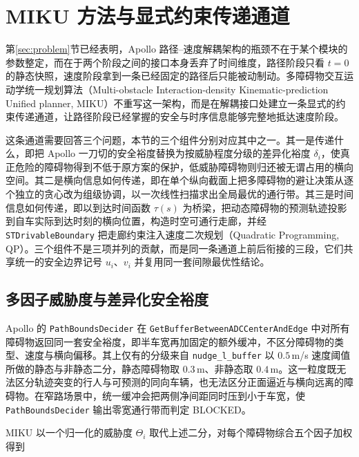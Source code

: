 \documentclass[a4paper,11pt]{ctexart}
\theoremstyle{definition}
\begin{document}

\section{MIKU 方法与显式约束传递通道}
\label{sec:method}

第\ref{sec:problem}节已经表明，Apollo 路径--速度解耦架构的瓶颈不在于某个模块的参数整定，而在于两个阶段之间的接口本身丢弃了时间维度，路径阶段只看 $t=0$ 的静态快照，速度阶段拿到一条已经固定的路径后只能被动制动。多障碍物交互运动学统一规划算法（Multi-obstacle Interaction-density Kinematic-prediction Unified planner, MIKU）不重写这一架构，而是在解耦接口处建立一条显式的约束传递通道，让路径阶段已经掌握的安全与时序信息能够完整地抵达速度阶段。

这条通道需要回答三个问题，本节的三个组件分别对应其中之一。其一是传递什么，即把 Apollo 一刀切的安全裕度替换为按威胁程度分级的差异化裕度 $\delta_i$，使真正危险的障碍物得到不低于原方案的保护，低威胁障碍物则归还被无谓占用的横向空间。其二是横向信息如何传递，即在单个纵向截面上把多障碍物的避让决策从逐个独立的贪心改为组级协调，以一次线性扫描求出全局最优的通行带。其三是时间信息如何传递，即以到达时间函数 $\tau(s)$ 为桥梁，把动态障碍物的预测轨迹投影到自车实际到达时刻的横向位置，构造时空可通行走廊，并经 \texttt{STDrivableBoundary} 把走廊约束注入速度二次规划（Quadratic Programming, QP）。三个组件不是三项并列的贡献，而是同一条通道上前后衔接的三段，它们共享统一的安全边界记号 $u_i$、$v_i$ 并复用同一套间隙最优性结论。

\subsection{多因子威胁度与差异化安全裕度}
\label{sec:method_threat}

Apollo 的 \texttt{PathBoundsDecider} 在 \texttt{GetBufferBetweenADCCenterAndEdge} 中对所有障碍物返回同一套安全裕度，即半车宽再加固定的额外缓冲，不区分障碍物的类型、速度与横向偏移。其上仅有的分级来自 \texttt{nudge\_l\_buffer} 以 $0.5$\,m/s 速度阈值所做的静态与非静态二分，静态障碍物取 $0.3$\,m、非静态取 $0.4$\,m。这一粒度既无法区分轨迹突变的行人与可预测的同向车辆，也无法区分正面逼近与横向远离的障碍物。在窄路场景中，统一缓冲会把两侧净间距同时压到小于车宽，使 \texttt{PathBoundsDecider} 输出零宽通行带而判定 BLOCKED。

MIKU 以一个归一化的威胁度 $\Theta_i$ 取代上述二分，对每个障碍物综合五个因子加权得到
\end{document}
